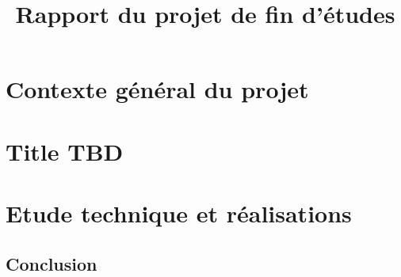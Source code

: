\documentclass[a4paper, french, 12pt]{report}
\title{Rapport du projet de fin d'études}\let\title\@title
\begin{document}
\begin{titlepage}
  
\end{titlepage}


\ClearShipoutPicture
\newpage









\tableofcontents
\listoftables
\listoffigures



\fancyhead{}
\fancyfoot{}
\fancyfoot[LE,RO]{\thepage}


\part{Contexte général du projet}

\part{Title TBD}

\part{Etude technique et réalisations}

\chapter{Conclusion}

\end{document}
